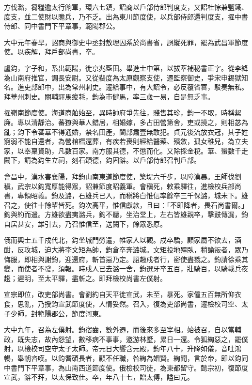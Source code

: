 \begin{pinyinscope}
 方伐潞，芻糧逾太行餉軍，環六七鎮，詔商以戶部侍郎判度支，又詔杜悰兼鹽鐵、度支，並二使財以贍兵，乃不乏。出為東川節度使，以兵部侍郎還判度支，擢中書侍郎、同中書門下平章事，範陽郡公。



 大中元年春旱，詔商與御史中丞封敖理囚系於尚書省，誤縱死罪，罷為武昌軍節度使。以疾解，拜戶部尚書，卒。



 盧鈞，字子和，系出範陽，徙京兆藍田。舉進士中第，以拔萃補秘書正字。從李絳為山南府推官，調長安尉。又從裴度為太原觀察支使，遷監察御史，爭宋申錫獄知名。進吏部郎中，出為常州刺史。遷給事中，有大詔令，必反覆省審，駁奏無私。拜華州刺史。關輔驛馬疲耗，鈞為市健馬，率三歲一易，自是無乏事。



 擢嶺南節度使。海道商舶始至，異時帥府爭先往，賤售其珍，鈞一不取，時稱絜廉。專以清靜治。蕃獠與華人錯居，相婚嫁，多占田營第舍，吏或撓之，則相苾為亂；鈞下令蕃華不得通婚，禁名田產，闔部肅壹無敢犯。貞元後流放衣冠，其子姓窮弱不能自還者，為營棺槥還葬，有疾若喪則經給醫藥、殯斂，孤女稚兒，為立夫家，以奉稟資助，凡數百家。南方服其德，不懲而化。又除採金稅。華、蠻數千走闕下，請為鈞生立祠，刻石頌德，鈞固辭。以戶部侍郎召判戶部。



 會昌中，漢水害襄陽，拜鈞山南東道節度使，築堤六千步，以障漢暴。王師伐劉稹，武宗以鈞寬厚能得眾，詔兼節度昭義軍。會稹死，敕乘驛往，進檢校兵部尚書，專領昭義。鈞及潞，石雄兵已入，而稹將白惟信率餘卒三千保潞，城未下。雄召之，使往十餘輩皆死。鈞次高平，惟信獻款，且曰：「不即降者，畏石尚書爾。」鈞與約而遣。方雄欲盡夷潞兵，鈞不聽，坐治堂上，左右皆雄親卒，擊鼓傳漏，鈞自居甚安，雄引去，乃召惟信至，送闕下，餘眾悉原。



 俄而興士五千戍代北，鈞坐城門勞遣，帷家人以觀。戍卒驕，顧家屬不欲去，酒酣，反攻城，迫大將李文矩為帥，鈞倉卒奔潞城。文矩投地殭臥，稍諭叛者，眾乃悔服，即相與謝鈞，迎還府，斬首惡乃定。詔趣戍者行，密使盡戮之。鈞請徐乘其變，而使者不發，須報。時戍人已去潞一舍，鈞選牙卒五百，壯騎百，以騎載兵夜趨；遲明，至太平驛，盡斬之。即拜檢校尚書左僕射。



 宣宗即位，改吏部尚書。會劉約自天平徙宣武，未至，暴死。家僮五百無所仰衣食，思亂，乃授鈞宣武節度使，人情妥然。召入，復為吏部尚書，遷檢校司空、太子少師，封範陽郡公，節度河東。



 大中九年，召為左僕射。鈞宿齒，數外遷，而後來多至宰相。始被召，自以當輔政，既失志，故內怨望，數移病不事事，邀游林墅，累日一還。令狐綯惡之，罷僕射，以檢校司空守太子太師。帝元日大饗含元殿，鈞年八十，升降如儀，音吐鴻暢，舉朝咨嘆。以鈞耆碩長者，顧不任職，咎綯為媢賢。綯聞，言於帝，即以鈞同中書門下平章事，為山南西道節度使。俄檢校司徒，為東都留守。懿宗初，復節度宣武，辭不拜，以太保致仕。卒，年八十七，贈太傅，謚曰元。




\end{pinyinscope}
